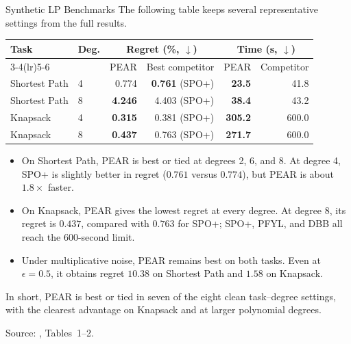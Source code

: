 \begin{frame}{Synthetic LP Benchmarks}
    The following table keeps several representative settings from the full results.

    \begin{center}
        {\scriptsize
        \setlength{\tabcolsep}{3.8pt}
        \renewcommand{\arraystretch}{1.25}
        \begin{tabular}{llrrrr}
            \toprule
            Task & Deg. & \multicolumn{2}{c}{Regret (\%, $\downarrow$)} & \multicolumn{2}{c}{Time (s, $\downarrow$)}\\
            \cmidrule(lr){3-4}\cmidrule(lr){5-6}
                 & & PEAR & Best competitor & PEAR & Competitor\\
            \midrule
            Shortest Path & 4 & 0.774 & \textbf{0.761} (SPO+) & \textbf{23.5} & 41.8\\
            Shortest Path & 8 & \textbf{4.246} & 4.403 (SPO+) & \textbf{38.4} & 43.2\\
            Knapsack      & 4 & \textbf{0.315} & 0.381 (SPO+) & \textbf{305.2} & 600.0\\
            Knapsack      & 8 & \textbf{0.437} & 0.763 (SPO+) & \textbf{271.7} & 600.0\\
            \bottomrule
        \end{tabular}}
    \end{center}

    \small
    \begin{itemize}
        \item On Shortest Path, PEAR is best or tied at degrees 2, 6, and 8. At degree 4, SPO+ is slightly better in regret ($0.761$ versus $0.774$), but PEAR is about $1.8\times$ faster.
        \item On Knapsack, PEAR gives the lowest regret at every degree. At degree 8, its regret is $0.437$, compared with $0.763$ for SPO+; SPO+, PFYL, and DBB all reach the 600-second limit.
        \item Under multiplicative noise, PEAR remains best on both tasks. Even at $\epsilon=0.5$, it obtains regret $10.38$ on Shortest Path and $1.58$ on Knapsack.
    \end{itemize}

    In short, PEAR is best or tied in seven of the eight clean task--degree settings, with the clearest advantage on Knapsack and at larger polynomial degrees.

    \vfill
    {\tiny Source: \citet{lee2026decisionfocusedlearningtangentspaceprojection}, Tables~1--2.}
\end{frame}

